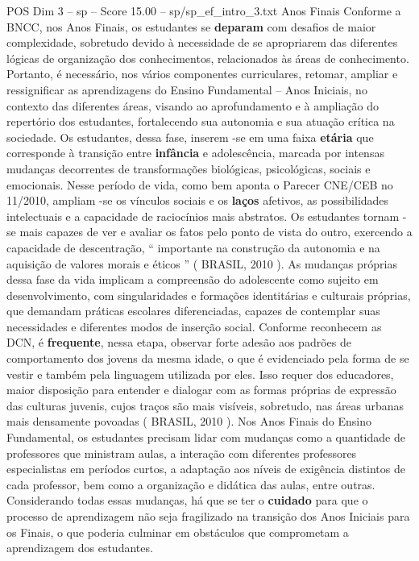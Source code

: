 \begin{textsample}{POS Dim 3 – sp – Score 15.00 – sp/sp\_ef\_intro\_3.txt}  \label{ex:f3_pos_205}
Anos Finais Conforme a BNCC, nos Anos Finais, os estudantes se \textbf{deparam} com desafios de maior complexidade, sobretudo devido à necessidade de se apropriarem das diferentes lógicas de organização dos conhecimentos, relacionados às áreas de conhecimento.
Portanto, é necessário, nos vários componentes curriculares, retomar, ampliar e ressignificar as aprendizagens do Ensino Fundamental – Anos Iniciais, no contexto das diferentes áreas, visando ao aprofundamento e à ampliação do repertório dos estudantes, fortalecendo sua autonomia e sua atuação crítica na sociedade.
Os estudantes, dessa fase, inserem -se em uma faixa \textbf{etária} que corresponde à transição entre \textbf{infância} e adolescência, marcada por intensas mudanças decorrentes de transformações biológicas, psicológicas, sociais e emocionais.
Nesse período de vida, como bem aponta o Parecer CNE/CEB no 11/2010, ampliam -se os vínculos sociais e os \textbf{laços} afetivos, as possibilidades intelectuais e a capacidade de raciocínios mais abstratos.
Os estudantes tornam -se mais capazes de ver e avaliar os fatos pelo ponto de vista do outro, exercendo a capacidade de descentração, “ importante na construção da autonomia e na aquisição de valores morais e éticos ” ( BRASIL, 2010 ).
As mudanças próprias dessa fase da vida implicam a compreensão do adolescente como sujeito em desenvolvimento, com singularidades e formações identitárias e culturais próprias, que demandam práticas escolares diferenciadas, capazes de contemplar suas necessidades e diferentes modos de inserção social.
Conforme reconhecem as DCN, é \textbf{frequente}, nessa etapa, observar forte adesão aos padrões de comportamento dos jovens da mesma idade, o que é evidenciado pela forma de se vestir e também pela linguagem utilizada por eles.
Isso requer dos educadores, maior disposição para entender e dialogar com as formas próprias de expressão das culturas juvenis, cujos traços são mais visíveis, sobretudo, nas áreas urbanas mais densamente povoadas ( BRASIL, 2010 ).
Nos Anos Finais do Ensino Fundamental, os estudantes precisam lidar com mudanças como a quantidade de professores que ministram aulas, a interação com diferentes professores especialistas em períodos curtos, a adaptação aos níveis de exigência distintos de cada professor, bem como a organização e didática das aulas, entre outras.
Considerando todas essas mudanças, há que se ter o \textbf{cuidado} para que o processo de aprendizagem não seja fragilizado na transição dos Anos Iniciais para os Finais, o que poderia culminar em obstáculos que comprometam a aprendizagem dos estudantes.

\end{textsample}
